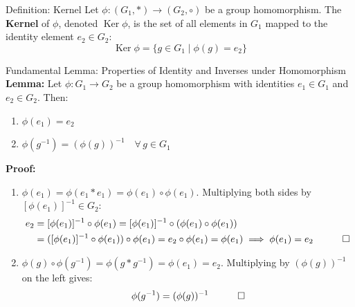 \documentclass[11pt,a4paper]{article}
\begin{document}
\begin{defbox}{Definition: Kernel}
Let $\phi: (G_1, *) \to (G_2, \circ)$ be a group homomorphism. The \textbf{Kernel} of $\phi$, denoted $\operatorname{Ker} \phi$, is the set of all elements in $G_1$ mapped to the identity element $e_2 \in G_2$:
\begin{equation}
    \operatorname{Ker} \phi = \{ g \in G_1 \mid \phi(g) = e_2 \}
\end{equation}
\end{defbox}

\begin{exbox}{Fundamental Lemma: Properties of Identity and Inverses under Homomorphism}
\textbf{Lemma:} Let $\phi: G_1 \to G_2$ be a group homomorphism with identities $e_1 \in G_1$ and $e_2 \in G_2$. Then:
\begin{enumerate}
    \item $\phi(e_1) = e_2$
    \item $\phi(g^{-1}) = (\phi(g))^{-1} \quad \forall\, g \in G_1$
\end{enumerate}

\textbf{Proof:}
\begin{enumerate}
    \item $\phi(e_1) = \phi(e_1 * e_1) = \phi(e_1) \circ \phi(e_1)$. Multiplying both sides by $[\phi(e_1)]^{-1} \in G_2$:
    \begin{align}
        e_2 &= [\phi(e_1)]^{-1} \circ \phi(e_1) = [\phi(e_1)]^{-1} \circ (\phi(e_1) \circ \phi(e_1)) \nonumber \\
            &= ([\phi(e_1)]^{-1} \circ \phi(e_1)) \circ \phi(e_1) = e_2 \circ \phi(e_1) = \phi(e_1) \implies \phi(e_1) = e_2 \quad \qed
    \end{align}
    
    \item $\phi(g) \circ \phi(g^{-1}) = \phi(g * g^{-1}) = \phi(e_1) = e_2$. Multiplying by $(\phi(g))^{-1}$ on the left gives:
    $$\phi(g^{-1}) = (\phi(g))^{-1} \quad \qed$$
\end{enumerate}
\end{exbox}
\end{document}
